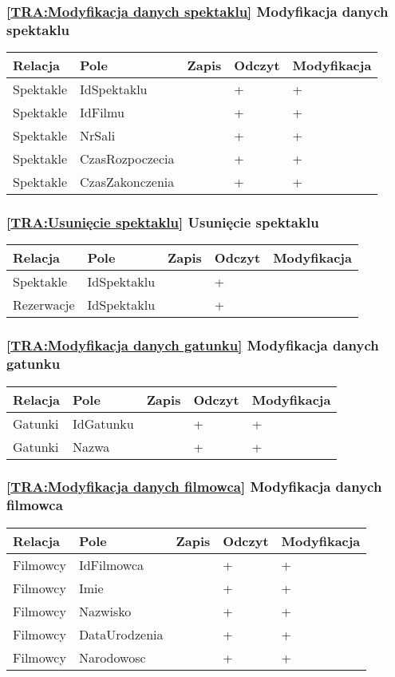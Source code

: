 \subsubsection*{\ref{TRA:Modyfikacja danych spektaklu} Modyfikacja danych spektaklu}
\begin{tabularx}{\textwidth}{|Y|Y|Y|Y|Y|}\hline
Relacja & Pole & Zapis & Odczyt & Modyfikacja \\\hline
Spektakle & IdSpektaklu &  & + & +\\
Spektakle & IdFilmu &  & + & +\\
Spektakle & NrSali &  & + & +\\
Spektakle & CzasRozpoczecia &  & + & +\\
Spektakle & CzasZakonczenia &  & + & +\\
\hline\end{tabularx}
\subsubsection*{\ref{TRA:Usunięcie spektaklu} Usunięcie spektaklu}
\begin{tabularx}{\textwidth}{|Y|Y|Y|Y|Y|}\hline
Relacja & Pole & Zapis & Odczyt & Modyfikacja \\\hline
Spektakle & IdSpektaklu &  & + & \\
Rezerwacje & IdSpektaklu &  & + & \\
\hline\end{tabularx}
\subsubsection*{\ref{TRA:Modyfikacja danych gatunku} Modyfikacja danych gatunku}
\begin{tabularx}{\textwidth}{|Y|Y|Y|Y|Y|}\hline
Relacja & Pole & Zapis & Odczyt & Modyfikacja \\\hline
Gatunki & IdGatunku &  & + & +\\
Gatunki & Nazwa &  & + & +\\
\hline\end{tabularx}
\subsubsection*{\ref{TRA:Modyfikacja danych filmowca} Modyfikacja danych filmowca}
\begin{tabularx}{\textwidth}{|Y|Y|Y|Y|Y|}\hline
Relacja & Pole & Zapis & Odczyt & Modyfikacja \\\hline
Filmowcy & IdFilmowca &  & + & +\\
Filmowcy & Imie &  & + & +\\
Filmowcy & Nazwisko &  & + & +\\
Filmowcy & DataUrodzenia &  & + & +\\
Filmowcy & Narodowosc &  & + & +\\
\hline\end{tabularx}
